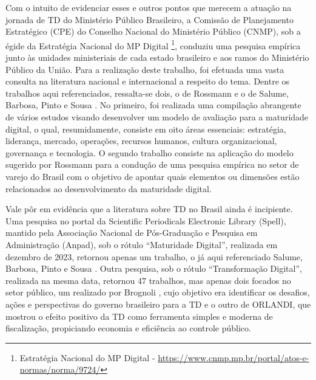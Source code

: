 Com o intuito de evidenciar esses e outros pontos que merecem a atuação na jornada de TD do Ministério Público Brasileiro, a Comissão de Planejamento Estratégico (CPE) do Conselho Nacional do Ministério Público (CNMP), sob a égide da Estratégia Nacional do MP Digital \footnote{Estratégia Nacional do MP Digital - \url{https://www.cnmp.mp.br/portal/atos-e-normas/norma/9724/}}, conduziu uma pesquisa empírica junto às unidades ministeriais de cada estado brasileiro e aos ramos do Ministério Público da União. Para a realização deste trabalho, foi efetuada uma vasta consulta na literatura nacional e internacional a respeito do tema. Dentre os trabalhos aqui referenciados, ressalta-se dois, o de Rossmann \cite{rossmann2018digital} e o de Salume, Barbosa, Pinto e Sousa \cite{salume2021key}. No primeiro, foi realizada uma compilação abrangente de vários estudos visando desenvolver um modelo de avaliação para a maturidade digital, o qual, resumidamente, consiste em oito áreas essenciais: estratégia, liderança, mercado, operações, recursos humanos, cultura organizacional, governança e tecnologia. O segundo trabalho consiste na aplicação do modelo sugerido por Rossmann \cite{rossmann2018digital} para a condução de uma pesquisa empírica no setor de varejo do Brasil com o objetivo de apontar quais elementos ou dimensões estão relacionados ao desenvolvimento da maturidade digital.

Vale pôr em evidência que a literatura sobre TD no Brasil ainda é incipiente. Uma pesquisa no portal da Scientific Periodicals Electronic Library (Spell), mantido pela Associação Nacional de Pós-Graduação e Pesquisa em Administração (Anpad), sob o rótulo “Maturidade Digital”, realizada em dezembro de 2023, retornou apenas um trabalho, o já aqui referenciado Salume, Barbosa, Pinto e Sousa \cite{salume2021key}. Outra pesquisa, sob o rótulo “Transformação Digital”, realizada na mesma data, retornou 47 trabalhos, mas apenas dois focados no setor público, um realizado por Brognoli \cite{da2020transformaccao}, cujo objetivo era identificar os desafios, ações e perspectivas do governo brasileiro para a TD e o outro de ORLANDI, que mostrou o efeito positivo da TD como ferramenta simples e moderna de fiscalização, propiciando economia e eficiência ao controle público.